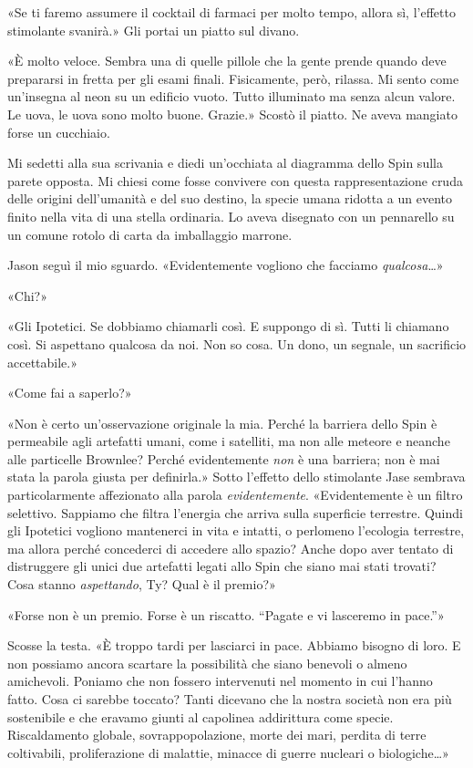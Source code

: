 «Se ti faremo assumere il cocktail di farmaci per molto tempo, allora
sì, l'effetto stimolante svanirà.» Gli portai un piatto sul divano.

«È molto veloce. Sembra una di quelle pillole che la gente prende quando
deve prepararsi in fretta per gli esami finali. Fisicamente, però,
rilassa. Mi sento come un'insegna al neon su un edificio vuoto. Tutto
illuminato ma senza alcun valore. Le uova, le uova sono molto buone.
Grazie.» Scostò il piatto. Ne aveva mangiato forse un cucchiaio.

Mi sedetti alla sua scrivania e diedi un'occhiata al diagramma dello
Spin sulla parete opposta. Mi chiesi come fosse convivere con questa
rappresentazione cruda delle origini dell'umanità e del suo destino, la
specie umana ridotta a un evento finito nella vita di una stella
ordinaria. Lo aveva disegnato con un pennarello su un comune rotolo di
carta da imballaggio marrone.

Jason seguì il mio sguardo. «Evidentemente vogliono che facciamo
\emph{qualcosa}\ldots»

«Chi?»

«Gli Ipotetici. Se dobbiamo chiamarli così. E suppongo di sì. Tutti li
chiamano così. Si aspettano qualcosa da noi. Non so cosa. Un dono, un
segnale, un sacrificio accettabile.»

«Come fai a saperlo?»

«Non è certo un'osservazione originale la mia. Perché la barriera dello
Spin è permeabile agli artefatti umani, come i satelliti, ma non alle
meteore e neanche alle particelle Brownlee? Perché evidentemente
\emph{non} è una barriera; non è mai stata la parola giusta per
definirla.» Sotto l'effetto dello stimolante Jase sembrava
particolarmente affezionato alla parola \emph{evidentemente}.
«Evidentemente è un filtro selettivo. Sappiamo che filtra l'energia che
arriva sulla superficie terrestre. Quindi gli Ipotetici vogliono
mantenerci in vita e intatti, o perlomeno l'ecologia terrestre, ma
allora perché concederci di accedere allo spazio? Anche dopo aver
tentato di distruggere gli unici due artefatti legati allo Spin che
siano mai stati trovati? Cosa stanno \emph{aspettando}, Ty? Qual è il
premio?»

«Forse non è un premio. Forse è un riscatto. ``Pagate e vi lasceremo in
pace.''»

Scosse la testa. «È troppo tardi per lasciarci in pace. Abbiamo bisogno
di loro. E non possiamo ancora scartare la possibilità che siano
benevoli o almeno amichevoli. Poniamo che non fossero intervenuti nel
momento in cui l'hanno fatto. Cosa ci sarebbe toccato? Tanti dicevano
che la nostra società non era più sostenibile e che eravamo giunti al
capolinea addirittura come specie. Riscaldamento globale,
sovrappopolazione, morte dei mari, perdita di terre coltivabili,
proliferazione di malattie, minacce di guerre nucleari o
biologiche\ldots»

